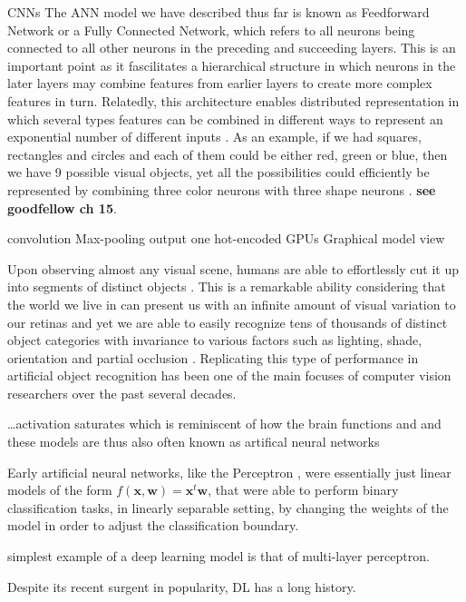 \documentclass{report}
\begin{document}
CNNs
The ANN model we have described thus far is known as Feedforward Network or a Fully Connected Network, which refers to all neurons being connected to all other neurons in the preceding and succeeding layers. This is an important point as it fascilitates a hierarchical structure in which neurons in the later layers may combine features from earlier layers to create more complex features in turn. Relatedly, this architecture enables distributed representation in which several types features can be combined in different ways to represent an exponential number of different inputs \cite{Hinton1986}. As an example, if we had squares, rectangles and circles and each of them could be either red, green or blue, then we have 9 possible visual objects, yet all the possibilities could efficiently be represented by combining three color neurons with three shape neurons \cite{Goodfellow2016}. \textbf{see goodfellow ch 15}.



convolution
Max-pooling 
output one hot-encoded
GPUs
Graphical model view


Upon observing almost any visual scene, humans are able to effortlessly cut it up into segments of distinct objects \cite{Rosch1976}. This is a remarkable ability considering that the world we live in can present us with an infinite amount of visual variation to our retinas and yet we are able to easily recognize tens of thousands of distinct object categories \cite{Biederman1989} with invariance to various factors such as lighting, shade, orientation and partial occlusion \cite{DiCarlo2012}. Replicating this type of performance in artificial object recognition has been one of the main focuses of computer vision researchers over the past several decades.


\dots activation saturates which is reminiscent of how the brain functions and and these models are thus also often known as artifical neural networks \cite{Goodfellow2016}

Early artificial neural networks, like the Perceptron \cite{Rosenblatt1958}, were essentially just linear models of the form $f(\mathbf{x}, \mathbf{w}) = \mathbf{x}^t \mathbf{w}$, that were able to perform binary classification tasks, in linearly separable setting, by changing the weights of the model in order to adjust the classification boundary. 

simplest example of a deep learning model is that of multi-layer perceptron. 


Despite its recent surgent in popularity, DL has a long history.
\end{document}
